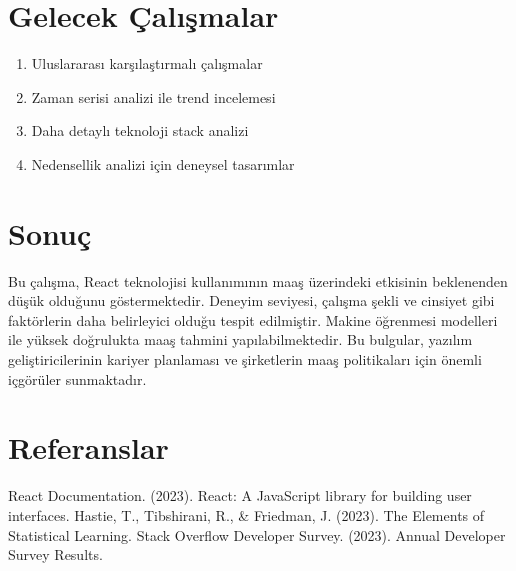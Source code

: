 \documentclass[12pt,a4paper]{article}
\begin{document}
\section{Gelecek Çalışmalar}
\begin{enumerate}
    \item Uluslararası karşılaştırmalı çalışmalar
    \item Zaman serisi analizi ile trend incelemesi
    \item Daha detaylı teknoloji stack analizi
    \item Nedensellik analizi için deneysel tasarımlar
\end{enumerate}

\section{Sonuç}
Bu çalışma, React teknolojisi kullanımının maaş üzerindeki etkisinin beklenenden düşük olduğunu göstermektedir. Deneyim seviyesi, çalışma şekli ve cinsiyet gibi faktörlerin daha belirleyici olduğu tespit edilmiştir. Makine öğrenmesi modelleri ile yüksek doğrulukta maaş tahmini yapılabilmektedir. Bu bulgular, yazılım geliştiricilerinin kariyer planlaması ve şirketlerin maaş politikaları için önemli içgörüler sunmaktadır.

\section{Referanslar}
\begin{thebibliography}{9}
 React Documentation. (2023). React: A JavaScript library for building user interfaces.
 Hastie, T., Tibshirani, R., \& Friedman, J. (2023). The Elements of Statistical Learning.
 Stack Overflow Developer Survey. (2023). Annual Developer Survey Results.
\end{thebibliography}
\end{document}
